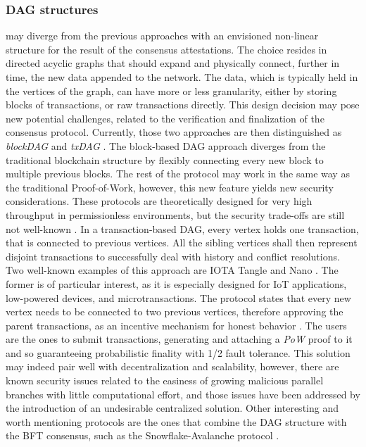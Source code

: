 \documentclass[journal]{IEEEtran}
\begin{document}
\subsubsection{DAG structures} may diverge from the previous approaches with an envisioned 
non-linear structure for the result of the consensus attestations. The choice resides in 
directed acyclic graphs that should expand and physically connect, further in time, the new
data appended to the network. The data, which is typically held in the vertices of the graph, 
can have more or less granularity, either by storing blocks of transactions, or raw transactions directly.
This design decision may pose new potential challenges, related to the verification and finalization of
the consensus protocol. Currently, those two approaches are then distinguished as \emph{blockDAG} and 
\emph{txDAG} \cite{survey-dist-consensus}. 
The block-based DAG approach diverges from the traditional blockchain structure by flexibly 
connecting every new block to multiple previous blocks. The rest of the protocol may work in the same way 
as the traditional Proof-of-Work, however, this new feature yields new security considerations. These protocols
are theoretically designed for very high throughput in permissionless environments, but the security trade-offs
are still not well-known \cite{sompolinsky2018phantom}.
In a transaction-based DAG, every vertex holds one transaction, that is connected to previous vertices. 
All the sibling vertices shall then represent disjoint transactions to successfully deal with history and conflict
resolutions. Two well-known examples of this approach are IOTA Tangle \cite{popov2018tangle} 
and Nano \cite{lemahieu2018nano}.
The former is of particular interest, as it is especially designed for IoT applications, low-powered devices, and
microtransactions. The protocol states that every new vertex needs to be connected to two previous vertices, 
therefore approving the parent transactions, as an incentive mechanism for honest behavior \cite{survey-dist-consensus}. 
The users are the ones to submit transactions, generating and attaching a \emph{PoW} proof to it and 
so guaranteeing probabilistic finality with 1/2 fault tolerance. This solution may indeed pair well with 
decentralization and scalability, however, there are known security issues related to the
easiness of growing malicious parallel branches with little computational effort, and those issues have been 
addressed by the introduction of an undesirable centralized solution. 
Other interesting and worth mentioning protocols are the ones that combine the DAG structure with the BFT consensus, 
such as the Snowflake-Avalanche protocol \cite{rocket2018snowflake}.
\end{document}
